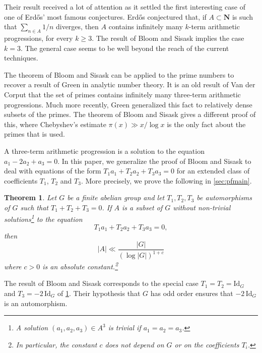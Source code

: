 \documentclass{daj}
\newtheorem{theorem}{Theorem}[section]
\theoremstyle{definition}
\newcommand{\N}{\ensuremath{\mathbf{N}}}
\begin{document}
Their result received a lot of attention as it settled the first interesting case of one of Erd\H{o}s' most famous conjectures. Erd\H{o}s conjectured that, if $A\subset \N$ is such that $\sum_{n\in A} 1/n$ diverges, then $A$ contains infinitely many $k$-term arithmetic progressions, for every $k\geq 3$. The result of Bloom and Sisask implies the case $k = 3$. The general case seems to be well beyond the reach of the current techniques.

The theorem of Bloom and Sisask can be applied to the prime numbers to recover a result of Green in analytic number theory. It is an old result of Van der Corput that the set of primes contains infinitely many three-term arithmetic progressions. Much more recently, Green \cite{green} generalized this fact to relatively dense subsets of the primes. The theorem of Bloom and Sisask gives a different proof of this, where Chebyshev's estimate $\pi(x) \gg x/\log{x}$ is the only fact about the primes that is used.

A three-term arithmetic progression is a solution to the equation $a_1 -2a_2 + a_3 = 0$. In this paper, we generalize the proof of Bloom and Sisask to deal with equations of the form $T_1a_1 +T_2a_2 + T_3a_3 = 0$ for an extended class of coefficients $T_1$, $T_2$ and $T_3$. More precisely, we prove the following in \cref{sec:pfmain}.

\begin{theorem}
\label{thm:main}
Let $G$ be a finite abelian group and let $T_1, T_2, T_3$ be automorphisms of $G$ such that $T_1 + T_2 + T_3 = 0$. If $A$ is a subset of $G$ without non-trivial solutions\footnote{A solution $(a_1, a_2, a_3)\in A^3$ is trivial if $a_1 = a_2 = a_3$.} to the equation 
\begin{equation}
\label{eq:ourequation}
T_1 a_1 + T_2 a_2 + T_3 a_3 = 0,
\end{equation}
then
\begin{equation*}
|A| \ll \frac{|G|}{(\log|G|)^{1+c}}
\end{equation*}
where $c > 0$ is an absolute constant.\footnote{In particular, the constant $c$ does not depend on $G$ or on the coefficients $T_i$.}
\end{theorem}

The result \cite[Corollary~3.2]{BS} of Bloom and Sisask corresponds to the special case ${T_1 = T_2 = \mathrm{Id}_{G}}$ and $T_3 = -2\, \mathrm{Id}_{G}$ of \cref{thm:main}. Their hypothesis that $G$ has odd order ensures that $-2\, \mathrm{Id}_{G}$ is an automorphism. 
\end{document}
